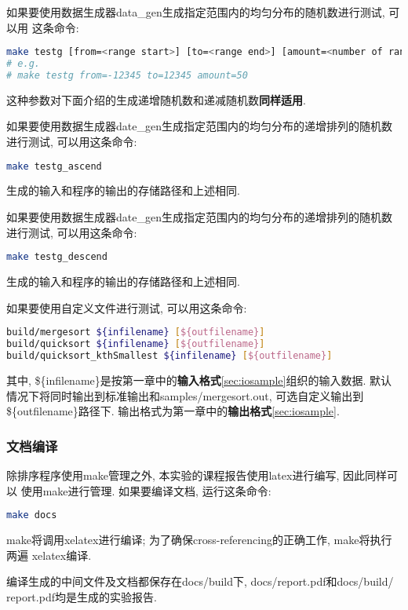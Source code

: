 如果要使用数据生成器data\_gen生成指定范围内的均匀分布的随机数进行测试, 可以用
这条命令:
\begin{lstlisting}[language=bash]
make testg [from=<range start>] [to=<range end>] [amount=<number of random numbers>]
# e.g. 
# make testg from=-12345 to=12345 amount=50
\end{lstlisting}
这种参数对下面介绍的生成递增随机数和递减随机数\textbf{同样适用}.\par

如果要使用数据生成器date\_gen生成指定范围内的均匀分布的递增排列的随机数进行测试,
可以用这条命令:
\begin{lstlisting}[language=bash]
make testg_ascend
\end{lstlisting}
生成的输入和程序的输出的存储路径和上述相同.\par

如果要使用数据生成器date\_gen生成指定范围内的均匀分布的递增排列的随机数进行测试,
可以用这条命令:
\begin{lstlisting}[language=bash]
make testg_descend
\end{lstlisting}
生成的输入和程序的输出的存储路径和上述相同.\par

如果要使用自定义文件进行测试, 可以用这条命令:
\begin{lstlisting}[language=bash]
build/mergesort ${infilename} [${outfilename}]
build/quicksort ${infilename} [${outfilename}]
build/quicksort_kthSmallest ${infilename} [${outfilename}]
\end{lstlisting}
其中, \$\{infilename\}是按第一章中的\textbf{输入格式}\ref{sec:iosample}组织的输入数据.
默认情况下将同时输出到标准输出和samples/mergesort.out, 可选自定义输出到
\$\{outfilename\}路径下. 输出格式为第一章中的\textbf{输出格式}\ref{sec:iosample}.

\subsubsection{文档编译}
除排序程序使用make管理之外, 本实验的课程报告使用latex进行编写, 因此同样可以
使用make进行管理. 如果要编译文档, 运行这条命令:
\begin{lstlisting}[language=bash]
make docs
\end{lstlisting}
make将调用xelatex进行编译; 为了确保cross-referencing的正确工作, make将执行两遍
xelatex编译.\par
编译生成的中间文件及文档都保存在docs/build下, docs/report.pdf和docs/build/
report.pdf均是生成的实验报告.

